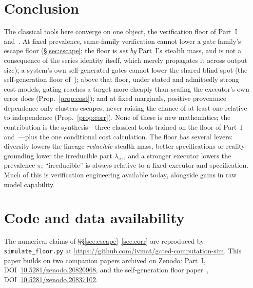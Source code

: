 \documentclass[11pt]{article}
\theoremstyle{definition}
\theoremstyle{remark}
\newcommand{\lirr}{\lambda_{\mathrm{irr}}}
\begin{document}
\section{Conclusion}
The classical tools here converge on one object, the verification floor of Part~I
and~\cite{matijasevic2026gg}. At fixed prevalence,
same-family verification cannot lower a gate family's escape floor (\S\ref{sec:escape}; the floor is
\emph{set by} Part~I's stealth mass, and is not a consequence of the series identity itself, which
merely propagates it across output size); a system's own self-generated gates cannot lower the shared
blind spot (the self-generation floor of~\cite{matijasevic2026gg}); above that floor, under stated and admittedly strong cost models, gating
reaches a target more cheaply than scaling the executor's own error does (Prop.~\ref{prop:cost}); and
at fixed marginals, positive provenance dependence only clusters escapes, never raising the chance of
at least one relative to independence (Prop.~\ref{prop:corr}). None of these is new mathematics; the
contribution is the synthesis---three classical tools trained on the floor of Part~I
and~\cite{matijasevic2026gg}---plus the one conditional cost calculation. The floor has several levers:
diversity lowers the lineage-\emph{reducible} stealth mass, better specifications or reality-grounding
lower the irreducible part $\lirr$, and a stronger executor lowers the prevalence $\pi$; ``irreducible''
is always relative to a fixed executor
and specification. Much of this is verification engineering available today, alongside gains in raw
model capability.

\section*{Code and data availability}
The numerical claims of \S\S\ref{sec:escape}--\ref{sec:corr} are reproduced by
\texttt{simulate\_floor.py} at \url{https://github.com/ivmat/gated-computation-sim}. This paper builds
on two companion papers archived on Zenodo: Part~I,
DOI~\href{https://doi.org/10.5281/zenodo.20820968}{10.5281/zenodo.20820968}, and the self-generation
floor paper~\cite{matijasevic2026gg},
DOI~\href{https://doi.org/10.5281/zenodo.20837102}{10.5281/zenodo.20837102}.
\end{document}
